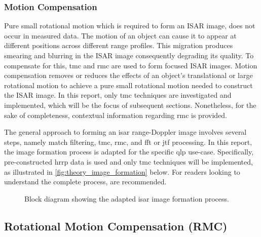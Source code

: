 \documentclass[class=report,11pt,crop=false]{standalone}
\begin{document}
        
    \subsubsection{Motion Compensation}
    Pure small rotational motion which is required to form an ISAR image, does not occur in measured data. The motion of an object can cause it to appear at different positions across different range profiles. This migration produces smearing and blurring in the ISAR image consequently degrading its quality. To compensate for this, \gls{tmc} and \gls{rmc} are used to form focused ISAR images. Motion compensation removes or reduces the effects of an object's translational or large rotational motion to achieve a pure small rotational motion needed to construct the ISAR image. In this report, only \gls{tmc} techniques are investigated and implemented, which will be the focus of subsequent sections. Nonetheless, for the sake of completeness, contextual information regarding \gls{rmc} is provided.
    
    The general approach to forming an \gls{isar} range-Doppler image involves several steps, namely match filtering, \gls{tmc}, \gls{rmc}, and \gls{fft} or \gls{jtf} processing. In this report, the image formation process is adapted for the specific \gls{qlp} use-case.  Specifically, pre-constructed \gls{hrrp} data is used and only \gls{tmc} techniques will be implemented, as illustrated in \autoref{fig:theory_image_formation} below. For readers looking to understand the complete process, \cite{ISARtextbook_Martorella,ISARtextbook_Matlab,yunus} are recommended.
    
    \begin{figure}[h]
        \centering
        \resizebox{\linewidth}{!}{}
        \caption{Block diagram showing the adapted \gls{isar} image formation process. \label{fig:theory_image_formation}}
    \end{figure}

    \subsection{Rotational Motion Compensation (RMC)} %
    
\end{document}
